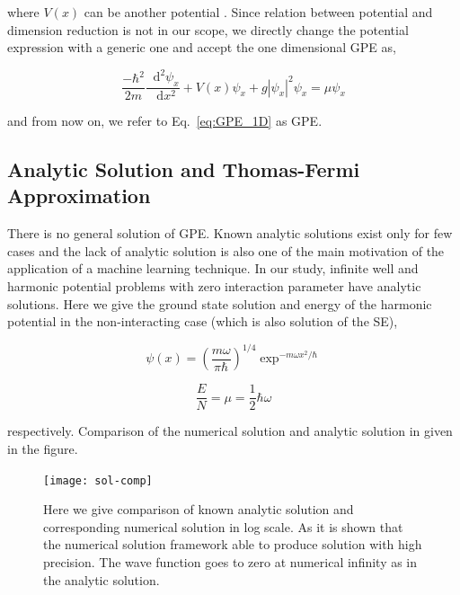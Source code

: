 \documentclass[a4paper,times,hidelinks,12pt]{article}
\newcommand*\dif{\mathop{}\!\mathrm{d}}
\begin{document}
\noindent where $V(x)$ can be another potential \cite{zheng2013dynamics}. Since relation between potential and dimension reduction is not in our scope, we directly change the potential expression with a generic one and accept the one dimensional GPE as,

\begin{equation}
    \label{eq:GPE_1D}
    \frac{-\hbar^2}{2m}\frac{\dif^2\psi_x}{\dif x^2} + V(x)\psi_x + g|\psi_x|^2\psi_x = \mu\psi_x
\end{equation}

\noindent and from now on, we refer to Eq.~\eqref{eq:GPE_1D} as GPE.

\subsection{Analytic Solution and Thomas-Fermi Approximation}

There is no general solution of GPE. Known analytic solutions exist only for few cases and the lack of analytic solution is also one of the main motivation of the application of a machine learning technique. In our study, infinite well and harmonic potential problems with zero interaction parameter have analytic solutions. Here we give the ground state solution and energy of the harmonic potential in the non-interacting case (which is also solution of the SE),

\begin{equation}
\label{eq:harmonic_ground_state_wave}
    \psi(x) = (\frac{m\omega}{\pi\hbar})^{1/4}\exp^{-m\omega x^2/\hbar}
\end{equation}

\begin{equation}
\label{eq:GPE_1D_solution_harmonic}
    \frac{E}{N} = \mu = \frac{1}{2}\hbar\omega
\end{equation}

\noindent respectively. Comparison of the numerical solution and analytic solution in given in the figure.

\graphicspath{{"../figs/numericanalyze/"}}
\begin{figure}[H]
\centering
    \texttt{[image: sol-comp]}
\caption{Here we give comparison of known analytic solution and corresponding numerical solution in log scale. As it is shown that the numerical solution framework able to produce solution with high precision. The wave function goes to zero at numerical infinity as in the analytic solution.}
\label{fig:dens_energy_error}
\end{figure}
\end{document}
